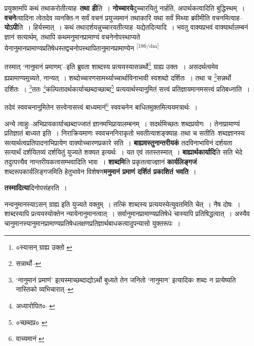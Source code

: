 \documentclass[article,12pt,a4paper]{memoir}
\begin{document}
	  \pstart प्रयुक्तमपि कथं तथाकरोतीत्याह--\textbf{तथा ही}ति । \textbf{नोच्चारये}दुच्चारयितुं नार्हति, अपार्थकत्वादिति बुद्धिस्थम् । \textbf{वचने}त्यादिना त्वेतदेव व्यनक्ति-न सर्वं वचनं प्रयुज्यमानं तथाकारि यथा सर्वं मिथ्या ब्रवीमीति वचनमित्याह--\textbf{योऽपी}ति । हिर्यस्मात् । कथं तथादर्शयन्नुच्चारयतीत्याह--यद्येतदित्यादि । भवतु वाक्यप्रभवं वाक्यार्थालम्बनं ज्ञानं सत्यार्थम्, तथापि कथमनुमानप्रामाण्यं वचनेनोपस्थाप्यते येनानुमानप्रामाण्यप्रतिषेधस्तद्वचनोपस्थापितानुमानप्रामाण्येन  \leavevmode\textsuperscript{\rmlatinfont\tiny [186/dm]} 
	  
	तस्मात् ‘नानुमानं प्रमाणम्’--इति ब्रुवता शाब्दस्य प्रत्ययस्यासन्नर्थो\footnote{०स्यासन् ग्राह्य उक्तो \cite{dp-msA} \cite{dp-edP} \cite{dp-edH} \cite{dp-edN}} ग्राह्य उक्तः । असदर्थत्वमेव ह्यप्रामाण्यमुच्यते, नान्यत् । शब्दोच्चारणसामर्थ्याच्चार्थाविनाभावी स्वशब्दो दर्शितः । तथा च \footnote{सन्नार्थो--\cite{dp-edE}}सन्नर्थो दर्शितः । \footnote{‘नानुमानं प्रमाणं’ इत्यस्माच्छब्दाद्योऽर्थो बुध्यते तेन जनितो ‘नानुमान’ इत्यादिकः शब्दः न प्रत्येष्यति नास्तिको व्यभिचारात्--\cite{dp-msD-n}}ततः \footnote{अध्यारोपित०--\cite{dp-msD-n}}कल्पितादर्थकार्याच्छब्दाच्छाब्द\footnote{०च्छब्दप्र० \cite{dp-msA}} प्रत्ययार्थस्यानुमितं सत्त्वं प्रतिज्ञायमानमसत्त्वं प्रतिबध्नाति । 
	  
	तदेवं स्ववचनानुमितेन सत्त्वेनासत्त्वं बाध्यमानं\footnote{वाच्यमानं \cite{dp-msA} \cite{dp-msB} \cite{dp-edP} \cite{dp-edH} \cite{dp-edE} \cite{dp-edN}} स्ववचनेन बाधितमुक्तमित्ययमत्रार्थः । 
	  
	अन्ये त्वाहुः--अभिप्रायकार्याच्छब्दाज्जातं ज्ञानमभिप्रायालम्बनम् । सदर्थमिच्छतः शब्दप्रयोगः । तेनाप्रामाण्यं प्रतिज्ञातं बाध्यत इति । निराक्रियमाणः स्ववचननिराकृतो भवतीत्याशङ्क्याह--तथा च सतीति--शब्दज्ञानस्य सत्यार्थत्वप्रतिपादनाभिप्रायेण वाक्योच्चारणप्रकारे सति । \textbf{बाह्यवस्तुनान्तरीयकं} तदविनाभाविनं दर्शयता सत्यार्थं दर्शयितव्यं दर्शयितुं युज्यते शक्यत इत्यर्थः । यत एवं ततस्तस्मात् । \textbf{बाह्यार्थकार्यादि}ति सति भेदे तदुत्पत्त्यैव नान्तरीयकत्वसम्भवादिति भावः । \textbf{शाब्दमि}ति प्रकृतत्वाज्ज्ञानं \textbf{कार्यलिङ्गजं} शब्दरूपकार्यलिङ्गजमिति हेतुभावेन विशेषण\textbf{मनुमानं प्रमाणं दर्शितं प्रकाशितं भवति} ।
	\pend
      

	  \pstart \textbf{तस्मादित्या}दिनोपसंहरति ।
	\pend
      

	  \pstart नन्वनुमानस्याऽसन् ग्राह्य इति युज्यते वक्तुम् । तत्किं शाब्दस्य प्रत्ययस्येत्युवतमिति चेत् । नैष दोषः । शाब्दस्यापि प्रत्ययस्योक्तेन न्यायेनानुमानत्वात् । सर्वानुमानप्रामाण्यप्रतिषेधे चास्यापि प्रतिषिद्धत्वात् । अस्यैव चानुमानस्यानुमानप्रामाण्यप्रतिषेधलक्षणप्रतिज्ञार्थबाधकत्वादुपन्यासो युक्तरूपः ।
	\pend
      
\end{document}
